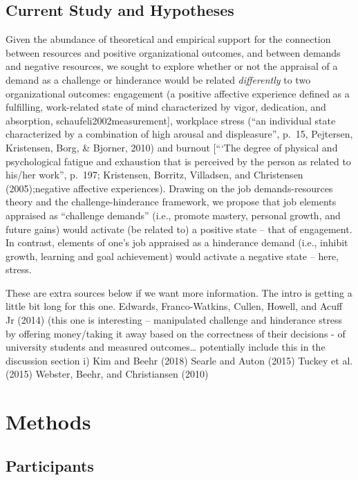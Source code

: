 \documentclass[
  english,
  man]{apa6}
\begin{document}
\hypertarget{current-study-and-hypotheses-1}{%
\subsection{Current Study and Hypotheses}\label{current-study-and-hypotheses-1}}

Given the abundance of theoretical and empirical support for the connection between resources and positive organizational outcomes, and between demands and negative resources, we sought to explore whether or not the appraisal of a demand as a challenge or hinderance would be related \emph{differently} to two organizational outcomes: engagement (a positive affective experience defined as a fulfilling, work-related state of mind characterized by vigor, dedication, and absorption, schaufeli2002measurement{]}, workplace stress (``an individual state characterized by a combination of high arousal and displeasure'', p.~15, Pejtersen, Kristensen, Borg, \& Bjorner, 2010) and burnout {[}\enquote{`The degree of physical and psychological fatigue and exhaustion that is perceived by the person as related to his/her work}, p.~197; Kristensen, Borritz, Villadsen, and Christensen (2005);negative affective experiences). Drawing on the job demands-resources theory and the challenge-hinderance framework, we propose that job elements appraised as \enquote{challenge demands} (i.e., promote mastery, personal growth, and future gains) would activate (be related to) a positive state -- that of engagement. In contrast, elements of one's job appraised as a hinderance demand (i.e., inhibit growth, learning and goal achievement) would activate a negative state -- here, stress.

These are extra sources below if we want more information. The intro is getting a little bit long for this one.
Edwards, Franco-Watkins, Cullen, Howell, and Acuff Jr (2014) (this one is interesting -- manipulated challenge and hinderance stress by offering money/taking it away based on the correctness of their decisions - of university students and measured outcomes\ldots{} potentially include this in the discussion section i)
Kim and Beehr (2018)
Searle and Auton (2015)
Tuckey et al. (2015)
Webster, Beehr, and Christiansen (2010)

\hypertarget{methods}{%
\section{Methods}\label{methods}}

\hypertarget{participants}{%
\subsection{Participants}\label{participants}}
\end{document}
